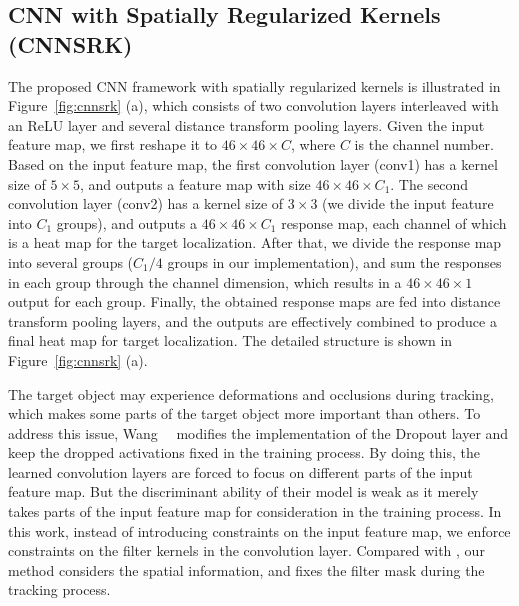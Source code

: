 \documentclass[10pt,twocolumn,letterpaper]{article}
\begin{document}
\subsection{CNN with Spatially Regularized Kernels (CNNSRK)}
The proposed CNN framework with spatially regularized kernels is illustrated in Figure~\ref{fig:cnnsrk} (a),
which consists of two convolution layers interleaved with an ReLU layer and several distance transform
pooling layers.
Given the input feature map, we first reshape it to $46\times 46\times C$, where $C$ is the channel number.
Based on the input feature map, the first convolution layer (conv1) has a kernel size of $5\times 5$, and outputs a feature map with
size $46\times46\times C_1$.
The second convolution layer (conv2) has a kernel size of $3\times 3$ (we divide the input feature
into $C_1$ groups), and outputs a $46\times46\times C_1$ response map, each channel of which is a heat
map for the target localization.
After that, we divide the response map into several groups ($C_1/4$ groups in our implementation), and sum the
responses in each group through the channel dimension, which results in a $46\times 46\times 1$ output for
each group.
Finally, the obtained response maps are fed into distance transform pooling layers, and the outputs are
effectively combined to produce a final heat map for target localization.
The detailed structure is shown in Figure~\ref{fig:cnnsrk} (a).

The target object may experience deformations and occlusions during tracking,
which makes some parts of the target object more important than others.
To address this issue, Wang~\etal~\cite{wang2016stct} modifies the implementation
of the Dropout layer and keep the dropped activations fixed in the training process.
By doing this, the learned convolution layers are forced to focus on different parts
of the input feature map.
But the discriminant ability of their model is weak as it merely takes parts of the
input feature map for consideration in the training process.
In this work, instead of introducing constraints on the input feature map, we enforce
constraints on the filter kernels in the convolution layer. Compared with \cite{wan2013regularization},
our method considers the spatial information, and fixes the filter mask during the tracking process.
\end{document}
